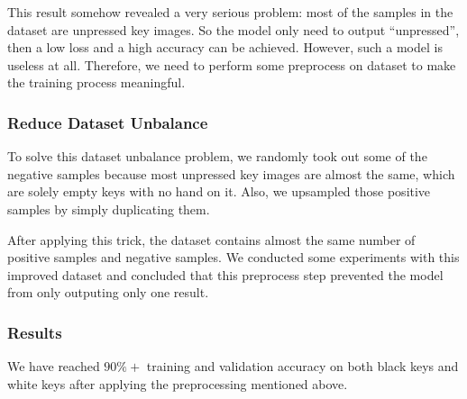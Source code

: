 \documentclass[10pt,twocolumn,letterpaper]{article}
\begin{document}
This result somehow revealed a very serious problem: most of the samples in the dataset are unpressed key images. So the model only need to output ``unpressed'', then a low loss and a high accuracy can be achieved. However, such a model is useless at all. Therefore, we need to perform some preprocess on dataset to make the training process meaningful.
\subsubsection{Reduce Dataset Unbalance}

To solve this dataset unbalance problem, we randomly took out some of the negative samples because most unpressed key images are almost the same, which are solely empty keys with no hand on it. Also, we upsampled those positive samples by simply duplicating them.

After applying this trick, the dataset contains almost the same number of positive samples and negative samples. We conducted some experiments with this improved dataset and concluded that this preprocess step prevented the model from only outputing only one result.
\subsubsection{Results} \label{results}

We have reached \(90\%+\) training and validation accuracy on both black keys and white keys after applying the preprocessing mentioned above.
\end{document}
